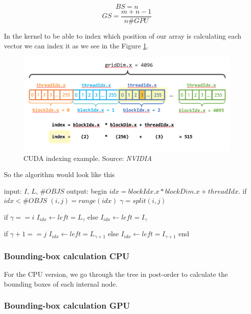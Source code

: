 \documentclass[titlepage,12pt]{report}
\begin{document}
$$
BS = n
$$
$$
GS = \frac{m + n - 1}{n \#GPU}
$$

In the kernel to be able to index which position of our array is calculating each vector we can index it as we see in the Figure \ref{indexing}.

\begin{figure}[H]
	\centering
	\includegraphics[scale=0.45]{media/cuda_indexing.png}
	\caption{CUDA indexing example. Source: \textit{NVIDIA}}
	\label{indexing}
\end{figure}

So the algorithm would look like this

\begin{algorithm}[caption={BVH construction GPU - parallel}, label={gpu_par_bvh}]
input: $I$, $L$, $\#OBJS$
output:
begin
  $idx = blockIdx.x * blockDim.x + threadIdx.$ 
  if $idx < \#OBJS$
    $(i,j) = range(idx)$
    $\gamma = split(i,j)$
    
    if $ \gamma == i $
      $I_{idx} \leftarrow left = L_{\gamma}$
    else 
      $I_{idx} \leftarrow left = I_{\gamma}$
    
    if $ \gamma+1 == j $
      $I_{idx} \leftarrow left = L_{\gamma+1}$
    else 
      $I_{idx} \leftarrow left = I_{\gamma+1}$
end
\end{algorithm}

\subsubsection{Bounding-box calculation CPU}

For the CPU version, we go through the tree in post-order to calculate the bounding boxes of each internal node. 

\subsubsection{Bounding-box calculation GPU}
\end{document}
